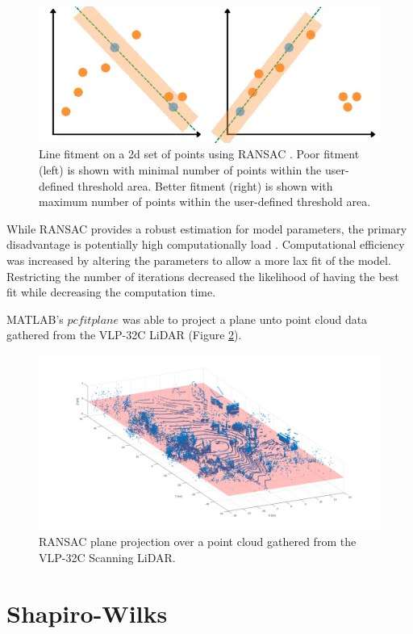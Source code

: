 \documentclass[numbered,pdftex]{ohio-etd}
\begin{document}
{{		\begin{figure}[H]
			\centering
			\includegraphics[width=0.7\linewidth]{Defense_Images/RANSAC_good_and_bad.png}
			\caption[2D Simplified RANSAC Example]{Line fitment on a 2d set of points using RANSAC \cite{alam_using_2022}. Poor fitment (left) is shown with minimal number of points within the user-defined threshold area. Better fitment (right) is shown with maximum number of points within the user-defined threshold area.}
			\label{fig:Ransac_2D_Example}
		\end{figure}

		{While RANSAC provides a robust estimation for model parameters, the primary disadvantage is potentially high computationally load \cite{yaniv_random_2010}. Computational efficiency was increased by altering the parameters to allow a more lax fit of the model. Restricting the number of iterations decreased the likelihood of having the best fit while decreasing the computation time.}
	
		{MATLAB's $pcfitplane$ was able to project a plane unto point cloud data gathered from the VLP-32C LiDAR (Figure \ref{fig:RANSAC_example_proj}).}
		
		\begin{figure}[H]
			\centering
			\includegraphics[width=0.7\linewidth]{Defense_Images/RANSAC_example_proj.png}
			\caption[RANSAC Plane Projection Example]{RANSAC plane projection over a point cloud gathered from the VLP-32C Scanning LiDAR.}
			\label{fig:RANSAC_example_proj}
		\end{figure}
		
	} %
	
	\section{Shapiro-Wilks}{
		
}}
\end{document}
